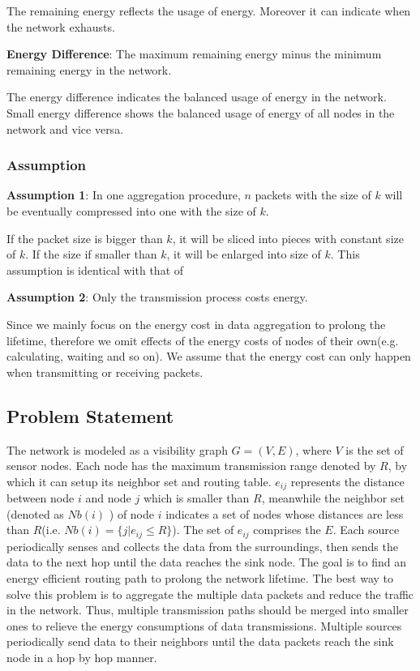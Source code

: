 \documentclass{elsarticle}
\begin{document}
The remaining energy reflects the usage of energy. Moreover it can indicate when the network exhausts.

\textbf{Energy Difference}: The maximum remaining energy minus the minimum remaining energy in the network.

The energy difference indicates the balanced usage of energy in the network. Small energy difference shows the balanced usage of energy of all nodes in the network and vice versa.

\subsubsection{Assumption}

\textbf{Assumption 1}: In one aggregation procedure, $n$ packets with the size of $k$ will be eventually compressed into one with the size of $k$.

If the packet size is bigger than $k$, it will be sliced into pieces with constant size of $k$. If the size if smaller than $k$, it will be enlarged into size of $k$. This assumption is identical with that of \cite{label-11}

\textbf{Assumption 2}: Only the transmission process costs energy.

Since we mainly focus on the energy cost in data aggregation to prolong the lifetime, therefore we omit effects of the energy costs of nodes of their own(e.g. calculating, waiting and so on). We assume that the energy cost can only happen when transmitting or receiving packets.

\subsection{Problem Statement} \label{ProblemStatement}
The network is modeled as a visibility graph $G=(V, E)$, where $V$ is the set of sensor nodes. Each node has the maximum transmission range denoted by $R$, by which it can setup its neighbor set and routing table. $e_{ij}$ represents the distance between node $i$ and node $j$ which is smaller than $R$, meanwhile the neighbor set (denoted as $Nb(i)$ ) of node $i$ indicates a set of nodes whose distances are less than $R$(i.e. $Nb(i)=\{j|e_{ij} \leq R\}$). The set of $e_{ij}$ comprises the $E$. Each source periodically senses and collects the data from the surroundings, then sends the data to the next hop until the data reaches the sink node. The goal is to find an energy efficient routing path to prolong the network lifetime. The best way to solve this problem is to aggregate the multiple data packets and reduce the traffic in the network. Thus, multiple transmission paths should be merged into smaller ones to relieve the energy consumptions of data transmissions. Multiple sources periodically send data to their neighbors until the data packets reach the sink node in a hop by hop manner.
\end{document}
